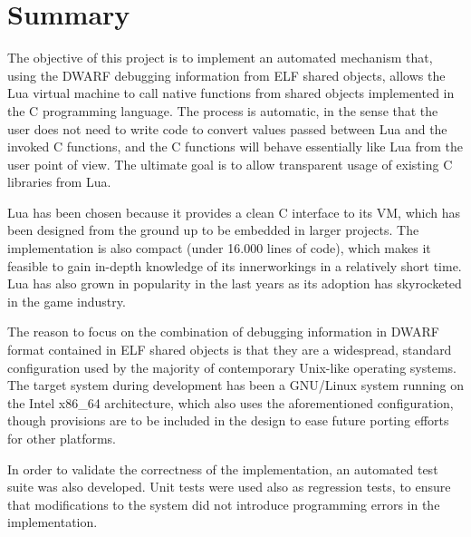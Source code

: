 \chapter*{Summary}

The objective of this project is to implement an automated mechanism that,
using the DWARF debugging information from ELF shared objects, allows the Lua
virtual machine to call native functions from shared objects implemented in
the C programming language. The process is automatic, in the sense that the
user does not need to write code to convert values passed between Lua and the
invoked C functions, and the C functions will behave essentially like Lua from
the user point of view. The ultimate goal is to allow transparent usage of
existing C libraries from Lua.

Lua has been chosen because it provides a clean C interface to its \gls{VM},
which has been designed from the ground up to be embedded in larger projects.
The implementation is also compact (under 16.000 lines of code), which makes
it feasible to gain in-depth knowledge of its innerworkings in a relatively
short time. Lua has also grown in popularity in the last years as its adoption
has skyrocketed in the game industry.

The reason to focus on the combination of debugging information in DWARF
format contained in ELF shared objects is that they are a widespread, standard
configuration used by the majority of contemporary Unix-like operating
systems. The target system during development has been a GNU/Linux system
running on the Intel x86\_64 architecture, which also uses the aforementioned
configuration, though provisions are to be included in the design to ease
future porting efforts for other platforms.

In order to validate the correctness of the implementation, an automated test
suite was also developed. Unit tests were used also as regression tests, to
ensure that modifications to the system did not introduce programming errors
in the implementation.
